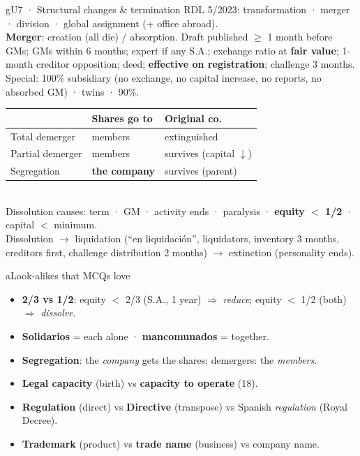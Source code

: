 \documentclass[9pt]{extarticle}
\newcommand{\col}[2]{\begin{minipage}[t]{#1\linewidth}\vspace{0pt}#2\end{minipage}}
\begin{document}
\col{0.49}{
\begin{bx}{g}{U7 · Structural changes \& termination}
RDL 5/2023: transformation · merger · division · global assignment (+ office abroad).\\
\textbf{Merger}: creation (all die) / absorption. Draft published $\geq$ 1 month before GMs; GMs within 6 months; expert if any S.A.; exchange ratio at \textbf{fair value}; 1-month creditor opposition; deed; \textbf{effective on registration}; challenge 3 months.\\
Special: 100\% subsidiary (no exchange, no capital increase, no reports, no absorbed GM) · twins · 90\%.\\
\begin{tabularx}{\linewidth}{@{}l X X@{}}\toprule & \textbf{Shares go to} & \textbf{Original co.}\\\midrule
Total demerger & members & extinguished\\ Partial demerger & members & survives (capital $\downarrow$)\\ Segregation & \textbf{the company} & survives (parent)\\\bottomrule\end{tabularx}\\[0.5mm]
Dissolution causes: term · GM · activity ends · paralysis · \textbf{equity $<$ 1/2} · capital $<$ minimum.\\
Dissolution $\rightarrow$ liquidation (``en liquidación'', liquidators, inventory 3 months, creditors first, challenge distribution 2 months) $\rightarrow$ extinction (personality ends).
\end{bx}
\begin{bx}{a}{Look-alikes that MCQs love}
\begin{itemize}
\item \textbf{2/3 vs 1/2}: equity $<$ 2/3 (S.A., 1 year) $\Rightarrow$ \textit{reduce}; equity $<$ 1/2 (both) $\Rightarrow$ \textit{dissolve}.
\item \textbf{Solidarios} = each alone · \textbf{mancomunados} = together.
\item \textbf{Segregation}: the \textit{company} gets the shares; demergers: the \textit{members}.
\item \textbf{Legal capacity} (birth) vs \textbf{capacity to operate} (18).
\item \textbf{Regulation} (direct) vs \textbf{Directive} (transpose) vs Spanish \textit{regulation} (Royal Decree).
\item \textbf{Trademark} (product) vs \textbf{trade name} (business) vs company name.

\end{itemize}
\end{bx}}
\end{document}
